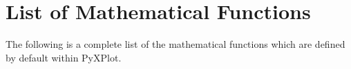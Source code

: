 %
%
%
%
%



\chapter{List of Mathematical Functions}
\label{function_list}

The following is a complete list of the mathematical functions which are defined by default within PyXPlot.

\newcommand{\funcdef}[2]{
\vspace{5mm}\noindent
{\large \bf #1}
\newline
The #1 function #2

}

